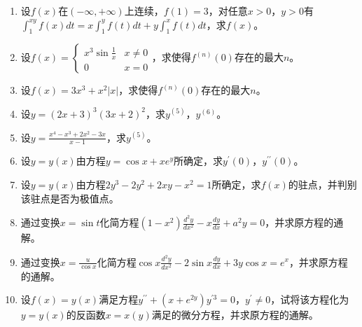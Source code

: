 \begin{enumerate}[{例}1.]
    \item 设$f(x)$在$(-\infty,+\infty)$上连续，$f(1)=3$，对任意$x>0$，$y>0$有$\int_1^{xy}f(x)dt=x\int_1^y f(t)dt+y\int_1^x f(t)dt$，求$f(x)$。
    \item 设$f(x)=\begin{cases}x^3 \sin \frac{1}{x} & x\neq 0\\
                                0 & x=0
                \end{cases}$，求使得$f^{(n)}(0)$存在的最大$n$。
    \item 设$f(x)=3x^3 + x^2 \left|x\right|$，求使得$f^{(n)}(0)$存在的最大$n$。
    \item 设$y=(2x+3)^3(3x+2)^2$，求$y^{(5)}$，$y^{(6)}$。
    \item 设$y=\frac{x^4-x^3+2x^2-3x}{x-1}$，求$y^{(5)}$。
    \item 设$y=y(x)$由方程$y=\cos x +xe^y$所确定，求$y^{\prime}(0)$，$y^{\prime\prime}(0)$。
    \item 设$y=y(x)$由方程$2y^3-2y^2+2xy-x^2 =1$所确定，求$f(x)$的驻点，并判别该驻点是否为极值点。
    \item 通过变换$x=\sin t$化简方程$(1-x^2)\frac{d^2y}{dx^2}-x\frac{dy}{dx}+a^2 y=0$，并求原方程的通解。
    \item 通过变换$x=\frac{u}{\cos x}$化简方程$\cos x \frac{d^2 y}{d x^2}-2\sin x \frac{dy}{dx}+3y \cos x=e^x$，并求原方程的通解。
    \item 设$f(x)=y(x)$满足方程$y^{\prime\prime}+(x+e^{2y})y^{\prime 3}=0$，$y^{\prime}\neq 0$，试将该方程化为$y=y(x)$的反函数$x=x(y)$满足的微分方程，并求原方程的通解。
\end{enumerate}
